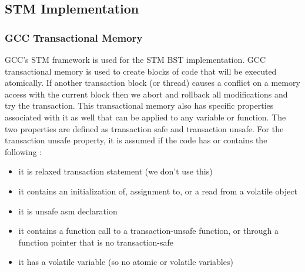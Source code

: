\documentclass[conference]{IEEEtran}
\theoremstyle{definition}
\theoremstyle{theorem}
\begin{document}

\subsection{STM Implementation}
\subsubsection{GCC Transactional Memory}
GCC's STM framework is used for the STM BST implementation. GCC transactional memory is used to create blocks of code that will be executed atomically. If another transaction block (or thread) causes a conflict on a memory access with the current block then we abort and rollback all modifications and try the transaction. This transactional memory also has specific properties associated with it as well that can be applied to any variable or function. The two properties are defined as transaction safe and transaction unsafe. For the transaction unsafe property, it is assumed if the code has or contains the following \cite{b4}:
\begin{itemize}
\item it is relaxed transaction statement (we don't use this)
\item it contains an initialization of, assignment to, or a read from a volatile object
\item it is unsafe asm declaration
\item it contains a function call to a transaction-unsafe function, or through a function pointer that is no transaction-safe
\item it has a volatile variable (so no atomic or volatile variables)
\end{itemize}
\end{document}
